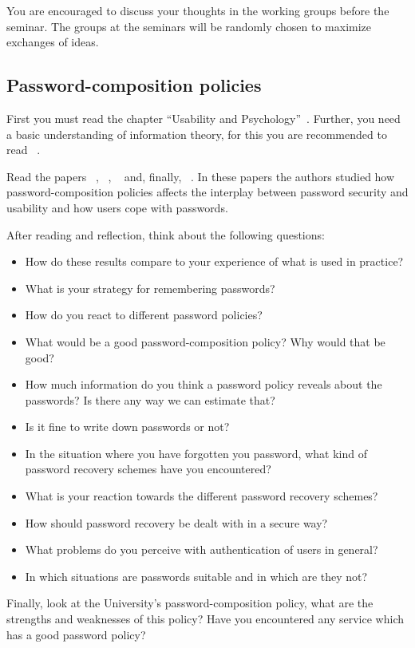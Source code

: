 You are encouraged to discuss your thoughts in the working groups before the 
seminar.
The groups at the seminars will be randomly chosen to maximize exchanges of 
ideas.

\subsection{Password-composition policies}

First you must read the chapter \enquote{Usability and 
  Psychology}~\cite[Ch.~2]{Anderson2008sea}.
Further, you need a basic understanding of information theory, for this you are 
recommended to read ~\cite{Ueltschi2013se}.

Read the papers
~\cite{OfPasswordsAndPeople}, 
~\cite{GuessAgainAndAgain},
~\cite{CanLongPasswordsBeSecureAndUsable} 
and, finally,
~\cite{PasswordLifeCycle}.
In these papers the authors studied how password-composition policies affects 
the interplay between password security and usability and how users cope with 
passwords.

After reading and reflection, think about the following questions:
\begin{itemize}
  \item How do these results compare to your experience of what is used in 
    practice?
  \item What is your strategy for remembering passwords?
  \item How do you react to different password policies?
  \item What would be a good password-composition policy?
    Why would that be good?
  \item How much information do you think a password policy reveals about the 
    passwords?
    Is there any way we can estimate that?
  \item Is it fine to write down passwords or not?
  \item In the situation where you have forgotten you password,
  	what kind of password recovery schemes have you encountered?
  \item What is your reaction towards the different password recovery schemes?  
  \item How should password recovery be dealt with in a secure way?
  \item What problems do you perceive with authentication of users in general?
  \item In which situations are passwords suitable and in which are they not?
\end{itemize}
Finally, look at the University's password-composition policy, what are the 
strengths and weaknesses of this policy?
Have you encountered any service which has a good password policy?

